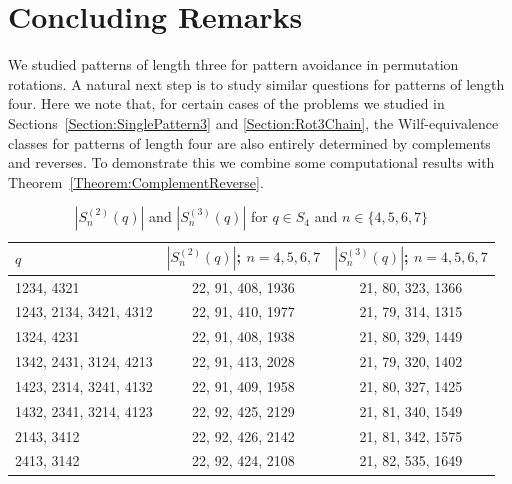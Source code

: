 \documentclass[10pt,a4paper]{amsart}
\numberwithin{equation}{section}
\begin{document}
\section{Concluding Remarks}\label{Section:Conclude}
We studied patterns of length three for pattern avoidance in permutation rotations. A natural next step is to study similar 
questions for patterns of length four. Here we note that, for certain cases of the problems we studied in Sections~\ref{Section:SinglePattern3} and \ref{Section:Rot3Chain}, the Wilf-equivalence classes for patterns of length four are also entirely determined by complements and reverses. To demonstrate this we combine some computational results with Theorem~\ref{Theorem:ComplementReverse}.
\begin{table}[H]
\renewcommand{\arraystretch}{1.5}
\centering
\begin{tabular}{|l||c|c|}
\hline
$q$ &$|S^{(2)}_n(q)|$; $n=4,5,6,7$&$|S^{(3)}_n(q)|$; $n=4,5,6,7$\\\hline\hline
1234, 4321&22, 91, 408, 1936&21, 80, 323, 1366\\\hline
1243, 2134, 3421, 4312&22, 91, 410, 1977&21, 79, 314, 1315\\\hline
1324, 4231&22, 91, 408, 1938&21, 80, 329, 1449\\\hline
1342, 2431, 3124, 4213&22, 91, 413, 2028&21, 79, 320, 1402\\\hline
1423, 2314, 3241, 4132&22, 91, 409, 1958&21, 80, 327, 1425\\\hline
1432, 2341, 3214, 4123&22, 92, 425, 2129&21, 81, 340, 1549\\\hline
2143, 3412&22, 92, 426, 2142&21, 81, 342, 1575\\\hline
2413, 3142&22, 92, 424, 2108&21, 82, 535, 1649\\\hline
\end{tabular}
\caption{$|S^{(2)}_n(q)|$ and $|S^{(3)}_n(q)|$ for $q\in S_4$ and $n\in\{4,5,6,7\}$}\label{Table1}
\end{table}
\end{document}
